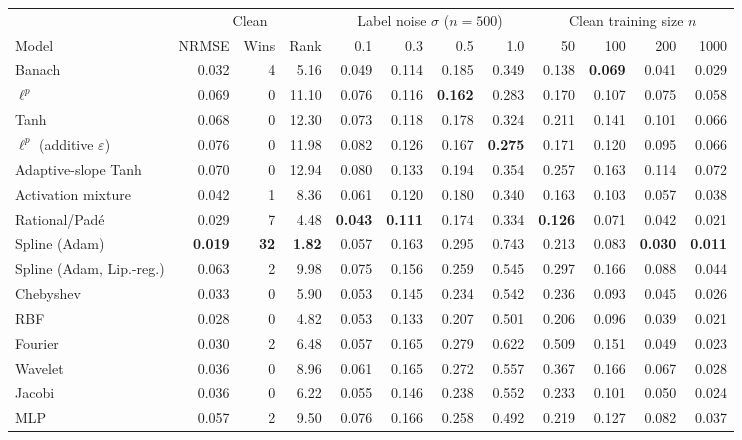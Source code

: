 \begin{tabular}{lrrrrrrrrrrr}
\toprule
& \multicolumn{3}{c}{Clean} & \multicolumn{4}{c}{Label noise $\sigma$ ($n=500$)} & \multicolumn{4}{c}{Clean training size $n$} \\
\cmidrule(lr){2-4}\cmidrule(lr){5-8}\cmidrule(lr){9-12}
Model & NRMSE & Wins & Rank & 0.1 & 0.3 & 0.5 & 1.0 & 50 & 100 & 200 & 1000 \\
\midrule
Banach & 0.032 & 4 & 5.16 & 0.049 & 0.114 & 0.185 & 0.349 & 0.138 & \textbf{0.069} & 0.041 & 0.029 \\
$\ell^p$ & 0.069 & 0 & 11.10 & 0.076 & 0.116 & \textbf{0.162} & 0.283 & 0.170 & 0.107 & 0.075 & 0.058 \\
Tanh & 0.068 & 0 & 12.30 & 0.073 & 0.118 & 0.178 & 0.324 & 0.211 & 0.141 & 0.101 & 0.066 \\
$\ell^p$ (additive $\varepsilon$) & 0.076 & 0 & 11.98 & 0.082 & 0.126 & 0.167 & \textbf{0.275} & 0.171 & 0.120 & 0.095 & 0.066 \\
Adaptive-slope Tanh & 0.070 & 0 & 12.94 & 0.080 & 0.133 & 0.194 & 0.354 & 0.257 & 0.163 & 0.114 & 0.072 \\
Activation mixture & 0.042 & 1 & 8.36 & 0.061 & 0.120 & 0.180 & 0.340 & 0.163 & 0.103 & 0.057 & 0.038 \\
Rational/Pad\'e & 0.029 & 7 & 4.48 & \textbf{0.043} & \textbf{0.111} & 0.174 & 0.334 & \textbf{0.126} & 0.071 & 0.042 & 0.021 \\
Spline (Adam) & \textbf{0.019} & \textbf{32} & \textbf{1.82} & 0.057 & 0.163 & 0.295 & 0.743 & 0.213 & 0.083 & \textbf{0.030} & \textbf{0.011} \\
Spline (Adam, Lip.-reg.) & 0.063 & 2 & 9.98 & 0.075 & 0.156 & 0.259 & 0.545 & 0.297 & 0.166 & 0.088 & 0.044 \\
Chebyshev & 0.033 & 0 & 5.90 & 0.053 & 0.145 & 0.234 & 0.542 & 0.236 & 0.093 & 0.045 & 0.026 \\
RBF & 0.028 & 0 & 4.82 & 0.053 & 0.133 & 0.207 & 0.501 & 0.206 & 0.096 & 0.039 & 0.021 \\
Fourier & 0.030 & 2 & 6.48 & 0.057 & 0.165 & 0.279 & 0.622 & 0.509 & 0.151 & 0.049 & 0.023 \\
Wavelet & 0.036 & 0 & 8.96 & 0.061 & 0.165 & 0.272 & 0.557 & 0.367 & 0.166 & 0.067 & 0.028 \\
Jacobi & 0.036 & 0 & 6.22 & 0.055 & 0.146 & 0.238 & 0.552 & 0.233 & 0.101 & 0.050 & 0.024 \\
MLP & 0.057 & 2 & 9.50 & 0.076 & 0.166 & 0.258 & 0.492 & 0.219 & 0.127 & 0.082 & 0.037 \\
\bottomrule
\end{tabular}
